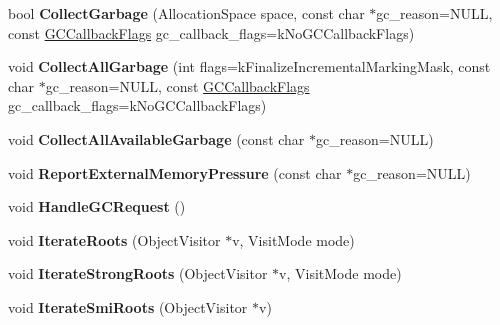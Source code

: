 \begin{DoxyCompactItemize}
\item 
bool {\bfseries Collect\+Garbage} (Allocation\+Space space, const char $\ast$gc\+\_\+reason=N\+U\+LL, const \hyperlink{namespacev8_a247c37a849f4d6c293b9b16e94e1944b}{G\+C\+Callback\+Flags} gc\+\_\+callback\+\_\+flags=k\+No\+G\+C\+Callback\+Flags)\hypertarget{classv8_1_1internal_1_1_heap_aa15f4635fb3510dd3647c5315931c424}{}\label{classv8_1_1internal_1_1_heap_aa15f4635fb3510dd3647c5315931c424}

\item 
void {\bfseries Collect\+All\+Garbage} (int flags=k\+Finalize\+Incremental\+Marking\+Mask, const char $\ast$gc\+\_\+reason=N\+U\+LL, const \hyperlink{namespacev8_a247c37a849f4d6c293b9b16e94e1944b}{G\+C\+Callback\+Flags} gc\+\_\+callback\+\_\+flags=k\+No\+G\+C\+Callback\+Flags)\hypertarget{classv8_1_1internal_1_1_heap_a74023ccaf1b5b13f5f688939b44fcf3d}{}\label{classv8_1_1internal_1_1_heap_a74023ccaf1b5b13f5f688939b44fcf3d}

\item 
void {\bfseries Collect\+All\+Available\+Garbage} (const char $\ast$gc\+\_\+reason=N\+U\+LL)\hypertarget{classv8_1_1internal_1_1_heap_adcb7ec243bbb40bbe0739e3fb64b5427}{}\label{classv8_1_1internal_1_1_heap_adcb7ec243bbb40bbe0739e3fb64b5427}

\item 
void {\bfseries Report\+External\+Memory\+Pressure} (const char $\ast$gc\+\_\+reason=N\+U\+LL)\hypertarget{classv8_1_1internal_1_1_heap_aa47b33bce4791f5b06f0734279af375a}{}\label{classv8_1_1internal_1_1_heap_aa47b33bce4791f5b06f0734279af375a}

\item 
void {\bfseries Handle\+G\+C\+Request} ()\hypertarget{classv8_1_1internal_1_1_heap_a3b7fee40f4550a5ae8c934ed8eba018c}{}\label{classv8_1_1internal_1_1_heap_a3b7fee40f4550a5ae8c934ed8eba018c}

\item 
void {\bfseries Iterate\+Roots} (Object\+Visitor $\ast$v, Visit\+Mode mode)\hypertarget{classv8_1_1internal_1_1_heap_a0c0159dc65d663c4c79b02183a8835dc}{}\label{classv8_1_1internal_1_1_heap_a0c0159dc65d663c4c79b02183a8835dc}

\item 
void {\bfseries Iterate\+Strong\+Roots} (Object\+Visitor $\ast$v, Visit\+Mode mode)\hypertarget{classv8_1_1internal_1_1_heap_aafc6ce4d8872af22f6e4e1a7c89bb4c9}{}\label{classv8_1_1internal_1_1_heap_aafc6ce4d8872af22f6e4e1a7c89bb4c9}

\item 
void {\bfseries Iterate\+Smi\+Roots} (Object\+Visitor $\ast$v)\hypertarget{classv8_1_1internal_1_1_heap_a5e92df22bc9c853c301678db051d7286}{}\label{classv8_1_1internal_1_1_heap_a5e92df22bc9c853c301678db051d7286}


\end{DoxyCompactItemize}
